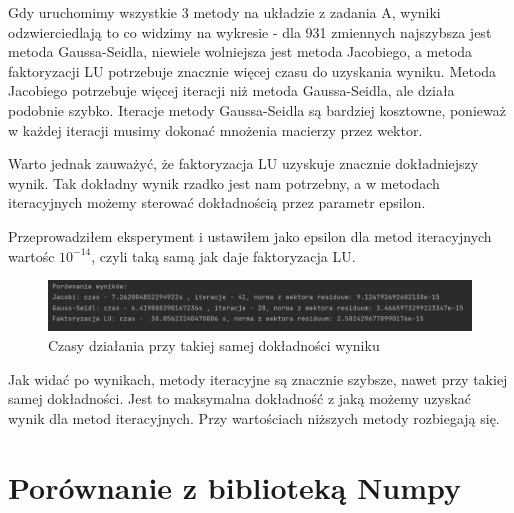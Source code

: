 \documentclass[fleqn]{article}
\begin{document}
    \noindent Gdy uruchomimy wszystkie 3 metody na układzie z zadania A, 
    wyniki odzwierciedlają to co widzimy na wykresie - dla 931 zmiennych najszybsza jest metoda 
    Gaussa-Seidla, niewiele wolniejsza jest metoda Jacobiego, a metoda faktoryzacji LU potrzebuje 
    znacznie więcej czasu do uzyskania wyniku. Metoda Jacobiego potrzebuje więcej iteracji niż metoda
    Gaussa-Seidla, ale działa podobnie szybko. Iteracje metody Gaussa-Seidla są bardziej kosztowne,
    ponieważ w każdej iteracji musimy dokonać mnożenia macierzy przez wektor.

    \noindent Warto jednak zauważyć, że faktoryzacja LU uzyskuje znacznie dokładniejszy wynik.
    Tak dokładny wynik rzadko jest nam potrzebny, a w metodach iteracyjnych możemy 
    sterować dokładnością przez parametr epsilon.

    \noindent Przeprowadziłem eksperyment i ustawiłem jako epsilon dla metod iteracyjnych wartośc $10^{-14}$,
    czyli taką samą jak daje faktoryzacja LU.

    \begin{figure}[h]

        \centering
        \includegraphics[width=\textwidth]{tasamadok.png}
        \centering
        \caption{Czasy działania przy takiej samej dokładności wyniku}

    \end{figure}

    \noindent Jak widać po wynikach, metody iteracyjne są znacznie szybsze,
    nawet przy takiej samej dokładności. Jest to maksymalna dokładność z jaką możemy uzyskać
    wynik dla metod iteracyjnych. Przy wartościach niższych metody rozbiegają się.
    
    \section{Porównanie z biblioteką Numpy}
\end{document}
